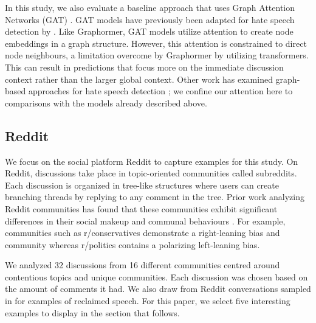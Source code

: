\documentclass[letterpaper]{article} %
\newcommand{\todo}[1]{{#1}}
\begin{document}
In this study, we also evaluate a baseline approach that uses Graph Attention Networks (GAT) \cite{velickovic2018graph}. GAT models have previously been adapted for hate speech detection by \citet{parmentier2019learning, parmentier2021}. Like Graphormer, GAT models utilize attention to create node embeddings in a graph structure. However, this attention is constrained to direct node neighbours, a limitation overcome by Graphormer by utilizing transformers. This can result in predictions that focus more on the immediate discussion context rather than the larger global context.  Other work has examined graph-based approaches for hate speech detection \cite{mishra-etal-2019-abusive, tian-etal-2022-duck}; we confine our attention here to comparisons with the models already described above.

\subsection{Reddit}
We focus on the social platform Reddit to capture examples for this study. On Reddit, discussions take place in topic-oriented communities called subreddits. Each discussion is organized in tree-like structures where users can create branching threads by replying to any comment in the tree. Prior work analyzing Reddit communities has found that these communities exhibit significant differences in their social makeup and communal behaviours \cite{Waller2021}. For example, communities such as r/conservatives demonstrate a right-leaning bias and community whereas r/politics contains a polarizing left-leaning bias.

We analyzed 32 discussions from 16 different communities centred around contentious topics and unique communities. Each discussion was chosen based on the amount of comments it had. We also draw from Reddit conversations sampled in \citet{kurrek2020towards} for examples of reclaimed speech. For this paper, we select five interesting examples to display in the section that follows.

\end{document}

